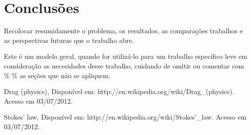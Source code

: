 
\section{Conclusões}
Recolocar resumidamente o problema, os resultados, as comparações
trabalhos e as perspectivas futuras que o trabalho abre.

{\color{red} Este é um modelo geral, quando for utilizá-lo para um trabalho
específico leve em consideração as necesidades desse trabalho,
cuidando de omitir ou comentar com \% \% as seções que não
se apliquem.}

\begin{thebibliography}{99}

Drag (physics), 
Disponível em: http://en.wikipedia.org/wiki/Drag\_(physics).
Acesso em 03/07/2012.

Stokes' law, 
Disponível em: http://en.wikipedia.org/wiki/Stokes'\_law.
Acesso em 03/07/2012.

\end{thebibliography}



